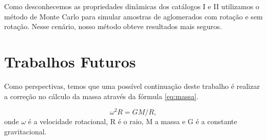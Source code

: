  Como desconhecemos as propriedades dinâmicas dos catálogos I e II utilizamos o método de Monte Carlo para simular amostras de aglomerados com rotação e sem rotação. Nesse cenário, nosso método obteve resultados mais seguros.


\section{Trabalhos Futuros}
\label{sec:trabalhosFuturos}

Como perspectivas, temos que uma possível continuação deste trabalho é realizar a correção no cálculo da massa através da fórmula \ref{eq:massa}. 

\begin{equation}
\omega^2 R = {GM}/{R},
\label{eq:massa}
\end{equation}
onde $\omega$ é a velocidade rotacional, R é o raio, M a massa e G é a constante gravitacional.